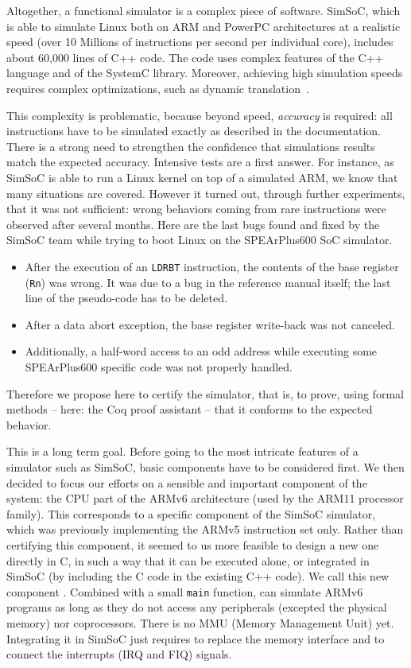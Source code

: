 Altogether, a functional simulator is a complex piece of software.
SimSoC, which is able to simulate Linux both on ARM and PowerPC
architectures at a realistic speed
(over 10 Millions of instructions per second per individual core), 
includes about 60,000 lines of C++
code. The code uses complex features of the C++ language and of the
SystemC library. Moreover, achieving high simulation speeds requires
complex optimizations, such as dynamic translation~\cite{qemu}.

This complexity is problematic, because beyond speed,
\emph{accuracy} is required:
all instructions have to be simulated
exactly as described in the documentation.
There is a strong need to strengthen the confidence that
simulations results match the expected accuracy. 
Intensive tests are a first answer.
For instance, as SimSoC is able to run a Linux kernel
on top of a simulated ARM, we know that many situations are covered.
However it turned out, through further experiments, that it was not
sufficient: wrong behaviors coming from rare instructions
were observed after several months.
%
Here are the last bugs found and fixed by the SimSoC team while trying to boot
Linux on the SPEArPlus600 SoC simulator.
\begin{itemize}
\item After the execution of an \texttt{LDRBT} instruction, the contents of the
  base register (\texttt{Rn}) was wrong. It was due to a bug in the reference
  manual itself; the last line of the pseudo-code has to be deleted.
\item After a data abort exception, the base register write-back was not
  canceled.
\item Additionally, a half-word access to an odd address while
  executing some SPEArPlus600 specific code was not properly handled. 
\end{itemize}

Therefore we propose here to certify the simulator,
that is, to prove, using formal methods --
here: the Coq proof assistant \cite{coqmanual,coqart} --
that it conforms to the expected behavior.

This is a long term goal.
Before going to the most intricate features of a simulator such as SimSoC,
basic components have to be considered first.
We then decided to focus our efforts on a sensible and important 
component of the system: the CPU part of the ARMv6 architecture 
(used by the ARM11 processor family).
%
This corresponds to a specific component of the SimSoC simulator,
which was previously implementing the ARMv5 instruction set only.
Rather than certifying this component, it seemed to us more feasible
to design a new one directly in C, in such a way that it can be
executed alone, or integrated in SimSoC (by including the C code in
the existing C++ code).
%
We call this new component \simlight \cite{rapido11}. Combined with a small
\texttt{main} function, \simlight can simulate ARMv6 programs as long
as they do not access any peripherals (excepted the physical memory)
nor coprocessors. There is no MMU (Memory Management Unit) yet. Integrating it in SimSoC just
requires to replace the memory interface and to connect the interrupts
(IRQ and FIQ) signals.

